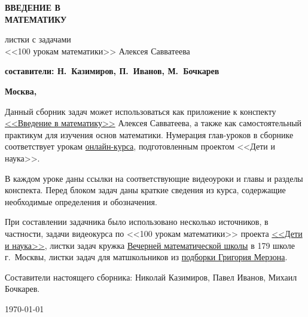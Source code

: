 {\thispagestyle{empty}


\begin{flushright}
\quad

\vspace{2cm}

{\fontsize{100pt}{0pt}\bfseries\sffamily ВВЕДЕНИЕ В\\[20pt] МАТЕМАТИКУ}


\vspace{2cm}

{\fontsize{20pt}{22pt}\sffamily листки с задачами\\
<<100 урокам математики>> Алексея Савватеева\\[5pt]
}

\vspace{2cm}

{\Large\bfseries\sffamily составители: Н.~Казимиров, П.~Иванов, М.~Бочкарев}

\vfill

{\Large\bfseries\sffamily 	Москва, \number\year}
\end{flushright}
}




 


Данный сборник задач может использоваться как приложение к конспекту \href{https://github.com/nkrishelie/mathempire/raw/master/250/250le\%C3\%A7ons.pdf}{<<Введение в математику>>} Алексея Савватеева, а также как самостоятельный практикум для изучения основ математики. Нумерация глав-уроков в сборнике соответствует урокам \href{https://childrenscience.ru/courses/sav/}{онлайн-курса}, подготовленным проектом <<Дети и наука>>.

В каждом уроке даны ссылки на соответствующие видеоуроки и главы и разделы конспекта. Перед блоком задач даны краткие сведения из курса, содержащие необходимые определения и обозначения.

При составлении задачника было использовано несколько источников, в частности, задачи видеокурса по <<100 урокам математики>> проекта \href{http://childrenscience.ru/}{<<Дети и наука>>}, листки задач кружка \href{https://www.shashkovs.ru/vmsh/}{Вечерней математической школы} в 179 школе г.~Москвы, листки задач для матшкольников из \href{https://dev.mccme.ru/~merzon/listki.html}{подборки Григория Мерзона}.

Составители настоящего сборника: Николай Казимиров, Павел Иванов, Михаил Бочкарев.


\quad

\quad \hfill \today



